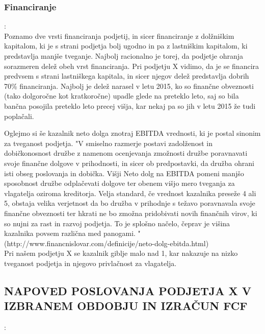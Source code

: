 \documentclass[12pt,a4paper]{amsart}
\theoremstyle{definition} %
\theoremstyle{plain} %
\begin{document}
\subsubsection{Financiranje}:\\

Poznamo dve vrsti financiranja podjetij, in sicer financiranje z dolžniškim kapitalom, ki je s strani podjetja bolj ugodno in pa z lastniškim kapitalom, ki predstavlja manjše tveganje. Najbolj racionalno je torej, da podjetje ohranja sorazmeren delež obeh vrst financiranja. Pri podjetju X vidimo, da je se financira predvsem s strani lastniškega kapitala, in sicer njegov delež predstavlja dobrih 70\% financiranja. Najbolj je delež narasel v letu 2015, ko so finančne obveznosti (tako dolgoročne kot kratkoročne) upadle glede na preteklo leto, saj so bila bančna posojila preteklo leto precej višja, kar nekaj pa so jih v letu 2015 že tudi poplačali.

Oglejmo si še kazalnik neto dolga znotraj EBITDA vrednosti, ki je postal sinonim za tveganost podjetja. "V smiselno razmerje postavi zadolženost in dobičkonosnost družbe z namenom ocenjevanja zmožnosti družbe poravnavati svoje finančne dolgove v prihodnosti, in sicer ob predpostavki, da družba ohrani isti obseg poslovanja in dobička. Višji Neto dolg na EBITDA pomeni manjšo sposobnost družbe odplačevati dolgove ter obenem višjo mero tveganja za vlagatelja oziroma kreditorja.
Velja standard, če vrednost kazalnika preseže 4 ali 5, obstaja velika verjetnost da bo družba v prihodnje s težavo poravnavala svoje finančne obveznosti ter hkrati ne bo zmožna pridobivati novih finančnih virov, ki so nujni za rast in razvoj podjetja. To je splošno načelo, čeprav je višina kazalnika povsem različna med panogami. "\\ 
(http://www.financnislovar.com/definicije/neto-dolg-ebitda.html)\\
Pri našem podjetju X se kazalnik giblje malo nad 1, kar nakazuje na nizko tveganost podjetja in njegovo privlačnost za vlagatelja.\\




\subsection{NAPOVED POSLOVANJA PODJETJA X V IZBRANEM OBDOBJU IN IZRAČUN FCF}:\\
\end{document}
